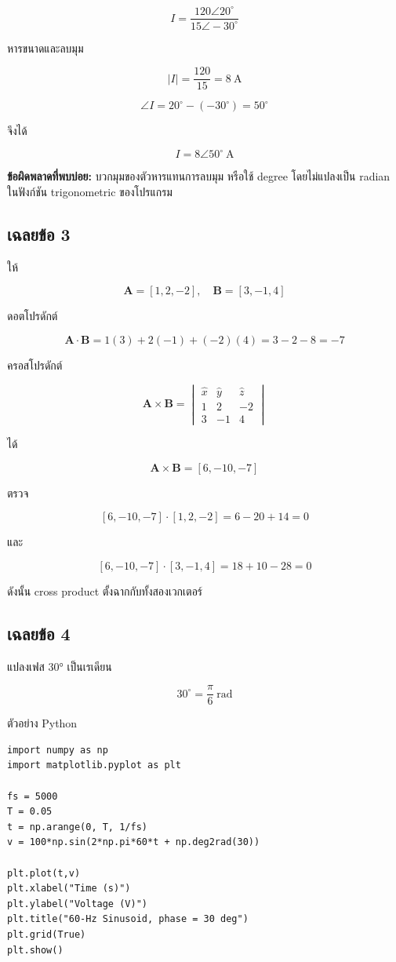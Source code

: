 \[
I=\frac{120\angle20^\circ}{15\angle-30^\circ}
\]

หารขนาดและลบมุม

\[
|I|=\frac{120}{15}=8\ \text{A}
\]

\[
\angle I=20^\circ-(-30^\circ)=50^\circ
\]

จึงได้

\[
I=8\angle50^\circ\ \text{A}
\]

\textbf{ข้อผิดพลาดที่พบบ่อย:} บวกมุมของตัวหารแทนการลบมุม หรือใช้ degree โดยไม่แปลงเป็น radian ในฟังก์ชัน trigonometric ของโปรแกรม

\subsection{เฉลยข้อ 3}

ให้

\[
\mathbf{A}=[1,2,-2],\quad \mathbf{B}=[3,-1,4]
\]

ดอตโปรดักต์

\[
\mathbf{A}\cdot\mathbf{B}
=1(3)+2(-1)+(-2)(4)=3-2-8=-7
\]

ครอสโปรดักต์

\[
\mathbf{A}\times\mathbf{B}
=
\begin{vmatrix}
\hat x&\hat y&\hat z\\
1&2&-2\\
3&-1&4
\end{vmatrix}
\]

ได้

\[
\mathbf{A}\times\mathbf{B}=[6,-10,-7]
\]

ตรวจ

\[
[6,-10,-7]\cdot[1,2,-2]=6-20+14=0
\]

และ

\[
[6,-10,-7]\cdot[3,-1,4]=18+10-28=0
\]

ดังนั้น cross product ตั้งฉากกับทั้งสองเวกเตอร์

\subsection{เฉลยข้อ 4}

แปลงเฟส 30° เป็นเรเดียน

\[
30^\circ=\frac{\pi}{6}\ \text{rad}
\]

ตัวอย่าง Python

\begin{verbatim}
import numpy as np
import matplotlib.pyplot as plt

fs = 5000
T = 0.05
t = np.arange(0, T, 1/fs)
v = 100*np.sin(2*np.pi*60*t + np.deg2rad(30))

plt.plot(t,v)
plt.xlabel("Time (s)")
plt.ylabel("Voltage (V)")
plt.title("60-Hz Sinusoid, phase = 30 deg")
plt.grid(True)
plt.show()
\end{verbatim}

